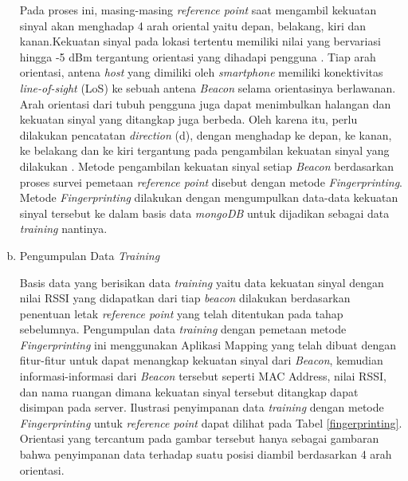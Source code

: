 \begin{enumerate}[a.]
	      \par Pada proses ini, masing-masing \textit{reference point} saat mengambil kekuatan sinyal akan menghadap 4 arah oriental yaitu depan, belakang, kiri dan kanan.Kekuatan sinyal pada lokasi tertentu memiliki nilai yang bervariasi hingga -5 dBm tergantung orientasi yang dihadapi pengguna \cite{Bahl2000}. Tiap arah orientasi, antena \textit{host} yang dimiliki oleh \textit{smartphone} memiliki konektivitas \textit{line-of-sight} (LoS) ke sebuah antena \textit{Beacon} selama orientasinya berlawanan. Arah orientasi dari tubuh pengguna juga dapat menimbulkan halangan dan kekuatan sinyal yang ditangkap juga berbeda. Oleh karena itu, perlu dilakukan pencatatan \textit{direction} (d), dengan menghadap ke depan, ke kanan, ke belakang dan ke kiri tergantung pada pengambilan kekuatan sinyal yang dilakukan \citep{christ1993}. Metode pengambilan kekuatan sinyal setiap \textit{Beacon} berdasarkan proses survei pemetaan \textit{reference point} disebut dengan metode \textit{Fingerprinting}. Metode \textit{Fingerprinting} dilakukan dengan mengumpulkan  data-data kekuatan sinyal tersebut ke dalam basis data \textit{mongoDB} untuk dijadikan sebagai data \textit{training} nantinya.

	\item Pengumpulan Data \textit{Training}
	      \par
	      Basis data yang berisikan data \textit {training} yaitu data kekuatan sinyal dengan nilai RSSI yang didapatkan dari tiap \textit{beacon} dilakukan berdasarkan penentuan letak \textit{reference point} yang telah ditentukan pada tahap sebelumnya. Pengumpulan data \textit{training} dengan pemetaan metode \textit{Fingerprinting} ini menggunakan Aplikasi Mapping yang telah dibuat dengan fitur-fitur untuk dapat menangkap kekuatan sinyal dari \textit{Beacon}, kemudian informasi-informasi dari \textit{Beacon} tersebut seperti MAC Address, nilai RSSI, dan nama ruangan dimana kekuatan sinyal tersebut ditangkap dapat disimpan pada server. Ilustrasi penyimpanan data \textit{training} dengan metode \textit{Fingerprinting} untuk \textit{reference point} dapat dilihat pada Tabel \ref{fingerprinting}. Orientasi yang tercantum pada gambar tersebut hanya sebagai gambaran bahwa penyimpanan data terhadap suatu posisi diambil berdasarkan 4 arah orientasi.


\end{enumerate}

